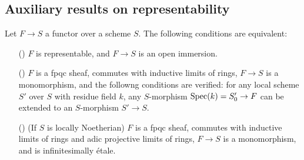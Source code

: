 \subsection{Auxiliary results on representability}
\begin{proposition}\label{scheme functor representable by open immersion iff}
Let $F\to S$ a functor over a scheme $S$. The following conditions are equivalent:
\begin{enumerate}
    \item[(\rmnum{1})] $F$ is representable, and $F\to S$ is an open immersion.
    \item[(\rmnum{2})] $F$ is a fpqc sheaf, commutes with inductive limits of rings, $F\to S$ is a monomorphism, and the followng conditions are verified: for any local scheme $S'$ over $S$ with residue field $k$, any $S$-morphism $\mathrm{Spec}(k)=S_0'\to F$ can be extended to an $S$-morphism $S'\to S$.
    \item[(\rmnum{3})] (If $S$ is locally Noetherian) $F$ is a fpqc sheaf, commutes with inductive limits of rings and adic projective limits of rings, $F\to S$ is a monomorphism, and is infinitesimally \'etale.  
\end{enumerate}
\end{proposition}

